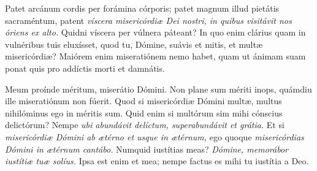{\noindent Patet arcánum cordis per forámina córporis; patet magnum illud pietátis sacraméntum, patent \emph{víscera misericórdiæ Dei nostri, in quibus visitávit nos óriens ex alto.} Quidni víscera per vúlnera páteant? In quo enim clárius quam in vulnéribus tuis eluxísset, quod tu, Dómine, suávis et mitis, et multæ misericórdiæ? Maiórem enim miseratiónem nemo habet, quam ut ánimam suam ponat quis pro addíctis morti et damnátis.

\noindent Meum proínde méritum, miserátio Dómini. Non plane sum mériti inops, quámdiu ille miseratiónum non fúerit. Quod si misericórdiæ Dómini multæ, multus nihilóminus ego in méritis sum. Quid enim si multórum sim mihi cónscius delictórum? Nempe \emph{ubi abundávit delíctum, superabundávit et grátia.} Et si \emph{misericórdiæ Dómini ab ætérno et usque in ætérnum,} ego quoque \emph{misericórdias Dómini in ætérnum cantábo.} Numquid iustítias meas? \emph{Dómine, memorábor iustítiæ tuæ solíus.} Ipsa est enim et mea; nempe factus es mihi tu iustítia a Deo.}
\newcommand{\responsoriumiii}{\pars{Responsorium 3.} \scriptura{\Rbardot{} Ps. 85, 12-13 \Vbardot{} ibid., 13; \textbf{H88}}

\vspace{-5mm}

\responsorium{IV}{temporalia/resp-confitebortibidomine-CROCHU-cumdox.gtex}{}

\rubrica{vel ad libitum:}

\vspace{3mm}

\pars{Responsorium 3.} \scriptura{\Rbardot{} Is. 53, 2.5 \Vbardot{} ibid., 4; \textbf{H178}}

\vspace{-2mm}

\responsorium{V}{temporalia/resp-eccevidimus-CROCHU-cumdox.gtex}{}}


